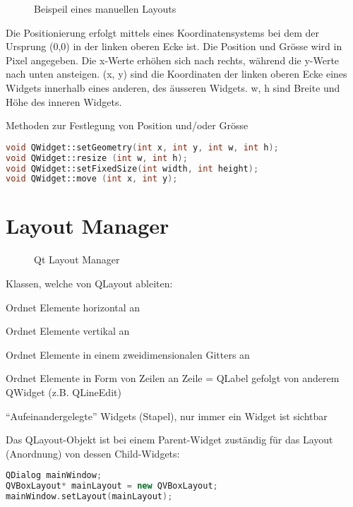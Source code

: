 \begin{figure}[ht]
    \centering
    \caption[]{Beispeil eines manuellen Layouts}
\end{figure}

Die Positionierung erfolgt mittels eines Koordinatensystems bei dem der Ursprung (0,0) in der linken oberen Ecke ist. Die Position und Grösse wird in Pixel angegeben. Die x-Werte erhöhen sich nach rechts, während die y-Werte nach unten ansteigen. (x, y) sind die Koordinaten der linken oberen Ecke eines Widgets innerhalb eines anderen, des äusseren Widgets. w, h sind Breite und Höhe des inneren Widgets.

Methoden zur Festlegung von Position und/oder Grösse
\begin{lstlisting}[language=c++]
void QWidget::setGeometry(int x, int y, int w, int h);
void QWidget::resize (int w, int h);
void QWidget::setFixedSize(int width, int height);
void QWidget::move (int x, int y);
\end{lstlisting}

\section{Layout Manager}
\begin{figure}[ht]
    \centering
    \caption[]{Qt Layout Manager}
\end{figure}

Klassen, welche von QLayout ableiten:
\begin{description}[leftmargin=*, widest={\textbf{\texttt{QStackedLayout}}}]
    \item[\texttt{QHBoxLayout}] Ordnet Elemente horizontal an
    \item[\texttt{QVBoxLayout}] Ordnet Elemente vertikal an
    \item[\texttt{QGridLayout}] Ordnet Elemente in einem zweidimensionalen Gitters an
    \item[\texttt{QFormLayout}] Ordnet Elemente in Form von Zeilen an Zeile = QLabel gefolgt von anderem QWidget (z.B. QLineEdit)
    \item[\texttt{QStackedLayout}] ``Aufeinandergelegte'' Widgets (Stapel), nur immer ein Widget ist sichtbar
\end{description}


Das QLayout-Objekt ist bei einem Parent-Widget zuständig für das Layout (Anordnung) von dessen Child-Widgets:
\begin{lstlisting}[language=c++]
QDialog mainWindow;
QVBoxLayout* mainLayout = new QVBoxLayout;
mainWindow.setLayout(mainLayout);
\end{lstlisting}

